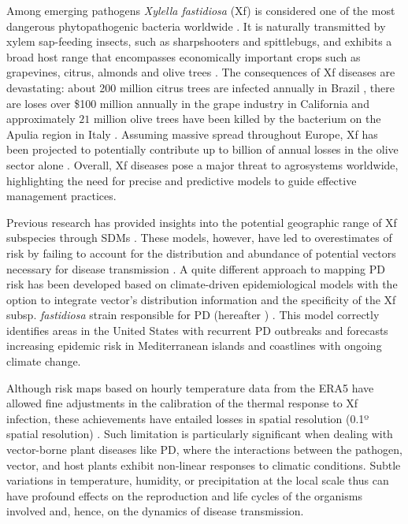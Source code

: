Among emerging pathogens \textit{Xylella fastidiosa} (Xf) is considered one
of the most dangerous phytopathogenic bacteria worldwide
\cite{Hopkins2002,EFSA_xf}. It is naturally transmitted by xylem sap-feeding
insects, such as sharpshooters and spittlebugs, and exhibits a broad host range
that encompasses economically important crops such as grapevines, citrus,
almonds and olive trees \cite{redak2004biology,EFSA_xf}. The consequences of Xf
diseases are devastating: about 200 million citrus trees are  infected annually
in Brazil \cite{Lindow2019}, there are	loses over \$100 million annually in
the grape industry in California  \cite{tumber2014pierce} and approximately
$21$ million olive trees have been killed by the bacterium on the Apulia region
in Italy  \cite{Sabelli2023}. Assuming massive spread throughout Europe, Xf has
been projected to potentially contribute up to  billion of annual
losses in the olive sector alone \cite{Schneider2020}. Overall, Xf diseases
pose a major threat to agrosystems worldwide, highlighting the need for precise
and predictive models to guide effective management practices.

Previous research has provided insights into the potential geographic range
of  Xf subspecies through SDMs \cite{Bosso2016b, Godefroid2022}. These models,
however, have led to overestimates of risk by failing to account for the
distribution and abundance of potential vectors necessary for disease
transmission  \cite{Godefroid2022_vector}.  A quite different approach to
mapping PD risk has been developed based on climate-driven epidemiological
models with the option to integrate vector's distribution information and the
specificity of the Xf  subsp. \textit{fastidiosa} strain responsible for PD
(hereafter \xf{}) \cite{GimenezRomero2022_CommsBio}. This model correctly
identifies
areas in the United States with recurrent  PD outbreaks and forecasts
increasing epidemic risk in Mediterranean islands and coastlines  with ongoing
climate change.

Although risk maps based on hourly temperature data from the ERA5 have
allowed fine adjustments in the calibration of the thermal response to Xf
infection, these achievements have entailed losses in spatial resolution (0.1º
spatial resolution) \cite{GimenezRomero2022_CommsBio, munoz2019era5land}. Such
limitation is particularly significant when dealing with vector-borne plant
diseases like PD, where the interactions between the pathogen, vector, and host
plants exhibit non-linear responses to climatic conditions. Subtle variations
in temperature, humidity, or precipitation at the local scale thus can have
profound effects on the reproduction and life cycles of the organisms involved
and, hence, on the dynamics of disease transmission.

